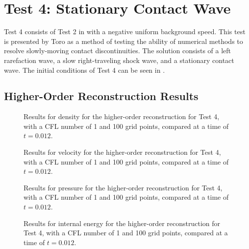 \section{Test 4: Stationary Contact Wave}
Test 4 consists of Test 2 in  with a negative uniform background speed. This test is presented by Toro \cite{toro2013riemann} as a method of testing the ability of numerical methods to resolve slowly-moving contact discontinuities. The solution consists of a left rarefaction wave, a slow right-traveling shock wave, and a stationary contact wave. The initial conditions of Test 4 can be seen in .
\subsection{Higher-Order Reconstruction Results}

\begin{figure}
	\caption[Results for density for the higher-order reconstruction for Test 4, with a CFL number of 1 and 100 grid points, compared at a time of $t=0.012$.]{Results for density for the higher-order reconstruction for Test 4, with a CFL number of 1 and 100 grid points, compared at a time of $t=0.012$.}
	\label{fig:Test5HORdensity}
\end{figure}

\begin{figure}
	\caption[Results for velocity for the higher-order reconstruction for Test 4, with a CFL number of 1 and 100 grid points, compared at a time of $t=0.012$.]{Results for velocity for the higher-order reconstruction for Test 4, with a CFL number of 1 and 100 grid points, compared at a time of $t=0.012$.}
	\label{fig:Test5HORvelocity}
\end{figure}

\begin{figure}
	\caption[Results for pressure for the higher-order reconstruction for Test 4, with a CFL number of 1 and 100 grid points, compared at a time of $t=0.012$.]{Results for pressure for the higher-order reconstruction for Test 4, with a CFL number of 1 and 100 grid points, compared at a time of $t=0.012$.}
	\label{fig:Test5HORpressure}
\end{figure}

\begin{figure}
	\caption[Results for internal energy for the higher-order reconstruction for Test 4, with a CFL number of 1 and 100 grid points, compared at a time of $t=0.012$.]{Results for internal energy for the higher-order reconstruction for Test 4, with a CFL number of 1 and 100 grid points, compared at a time of $t=0.012$.}
	\label{fig:Test5HORenergy}
\end{figure}

